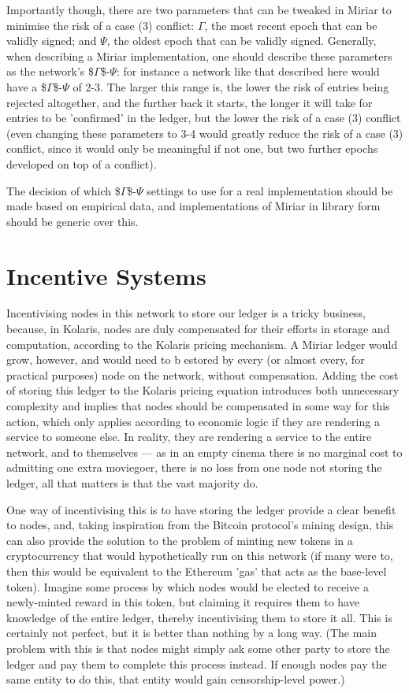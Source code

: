 \documentclass{extreport}
\begin{document}
Importantly though, there are two parameters that can be tweaked in Miriar to minimise the risk of a case (3) conflict: \(\Gamma\), the most recent epoch that can be validly signed; and \(\Psi\), the oldest epoch that can be validly signed. Generally, when describing a Miriar implementation, one should describe these parameters as the network's \$\(\Gamma\)\$-\(\Psi\): for instance a network like that described here would have a \$\(\Gamma\)\$-\(\Psi\) of 2-3. The larger this range is, the lower the risk of entries being rejected altogether, and the further back it starts, the longer it will take for entries to be 'confirmed' in the ledger, but the lower the risk of a case (3) conflict (even changing these parameters to 3-4 would greatly reduce the risk of a case (3) conflict, since it would only be meaningful if not one, but two further epochs developed on top of a conflict).

The decision of which \$\(\Gamma\)\$-\(\Psi\) settings to use for a real implementation should be made based on empirical data, and implementations of Miriar in library form should be generic over this.

\chapter{Incentive Systems}
\label{sec:org66e610c}

Incentivising nodes in this network to store our ledger is a tricky business, because, in Kolaris, nodes are duly compensated for their efforts in storage and computation, according to the Kolaris pricing mechanism. A Miriar ledger would grow, however, and would need to b estored by every (or almost every, for practical purposes) node on the network, without compensation. Adding the cost of storing this ledger to the Kolaris pricing equation introduces both unnecessary complexity and implies that nodes should be compensated in some way for this action, which only applies according to economic logic if they are rendering a service to someone else. In reality, they are rendering a service to the entire network, and to themselves --- as in an empty cinema there is no marginal cost to admitting one extra moviegoer, there is no loss from one node not storing the ledger, all that matters is that the vast majority do.

One way of incentivising this is to have storing the ledger provide a clear benefit to nodes, and, taking inspiration from the Bitcoin protocol's mining design, this can also provide the solution to the problem of minting new tokens in a cryptocurrency that would hypothetically run on this network (if many were to, then this would be equivalent to the Ethereum 'gas' that acts as the base-level token). Imagine some process by which nodes would be elected to receive a newly-minted reward in this token, but claiming it requires them to have knowledge of the entire ledger, thereby incentivising them to store it all. This is certainly not perfect, but it is better than nothing by a long way. (The main problem with this is that nodes might simply ask some other party to store the ledger and pay them to complete this process instead. If enough nodes pay the same entity to do this, that entity would gain censorship-level power.)
\end{document}
